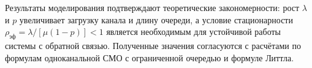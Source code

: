 \documentclass[a4paper,14pt,oneside,openany]{memoir}
\begin{document}
Результаты моделирования подтверждают теоретические закономерности: рост $\lambda$ и $p$ увеличивает загрузку канала и длину очереди, а условие стационарности $\rho_\text{эф}=\lambda/[\mu(1-p)]<1$ является необходимым для устойчивой работы системы с обратной связью. Полученные значения согласуются с расчётами по формулам одноканальной СМО с ограниченной очередью и формуле Литтла.
\end{document}
